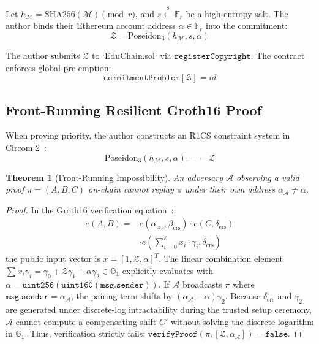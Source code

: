 \documentclass[conference,10pt]{IEEEtran}
\newtheorem{theorem}{Theorem}
\begin{document}
Let $h_{\mathcal{M}} = \text{SHA256}(\mathcal{M}) \pmod r$, and $s \xleftarrow{\$} \mathbb{F}_r$ be a high-entropy salt. The author binds their Ethereum account address $\alpha \in \mathbb{F}_r$ into the commitment:
\begin{equation}
    \mathcal{Z} = \text{Poseidon}_3(h_{\mathcal{M}}, s, \alpha)
\end{equation}

The author submits $\mathcal{Z}$ to `EduChain.sol` via $\mathtt{registerCopyright}$. The contract enforces global pre-emption:
\begin{equation}
    \mathtt{commitmentProblem}[\mathcal{Z}] = id
\end{equation}

\subsection{Front-Running Resilient Groth16 Proof}
When proving priority, the author constructs an R1CS constraint system in Circom 2~\cite{bensasson2014snarks}:
\begin{equation}
    \text{Poseidon}_3(h_{\mathcal{M}}, s, \alpha) == \mathcal{Z}
\end{equation}

\begin{theorem}[Front-Running Impossibility]
An adversary $\mathcal{A}$ observing a valid proof $\pi = (A, B, C)$ on-chain cannot replay $\pi$ under their own address $\alpha_{\mathcal{A}} \neq \alpha$.
\end{theorem}

\begin{proof}
In the Groth16 verification equation~\cite{groth2016size}:
\begin{equation}
\begin{split}
    e(A, B) = {} & e(\alpha_{\text{crs}}, \beta_{\text{crs}}) \cdot e(C, \delta_{\text{crs}}) \\
                 & \cdot e\left(\sum_{i=0}^{\ell} x_i \cdot \gamma_i, \delta_{\text{crs}}\right)
\end{split}
\end{equation}
the public input vector is $x = [1, \mathcal{Z}, \alpha]^T$. The linear combination element $\sum x_i \gamma_i = \gamma_0 + \mathcal{Z}\gamma_1 + \alpha \gamma_2 \in \mathbb{G}_1$ explicitly evaluates with $\alpha = \mathtt{uint256}(\mathtt{uint160}(\mathtt{msg.sender}))$. If $\mathcal{A}$ broadcasts $\pi$ where $\mathtt{msg.sender} = \alpha_{\mathcal{A}}$, the pairing term shifts by $(\alpha_{\mathcal{A}} - \alpha)\gamma_2$. Because $\delta_{\text{crs}}$ and $\gamma_2$ are generated under discrete-log intractability during the trusted setup ceremony, $\mathcal{A}$ cannot compute a compensating shift $C'$ without solving the discrete logarithm in $\mathbb{G}_1$. Thus, verification strictly fails: $\mathtt{verifyProof}(\pi, [\mathcal{Z}, \alpha_{\mathcal{A}}]) = \mathtt{false}$.
\end{proof}
\end{document}
